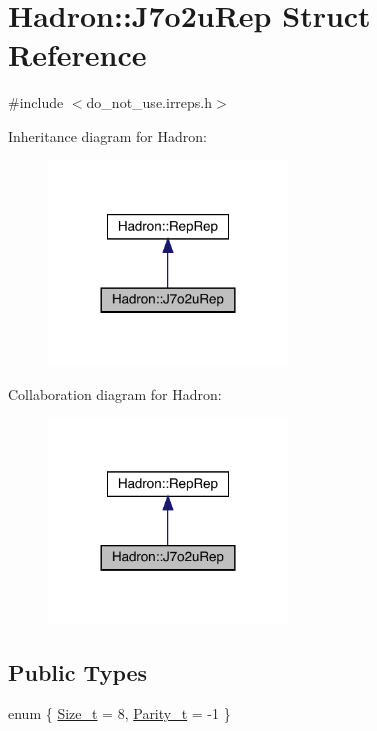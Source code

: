 \hypertarget{structHadron_1_1J7o2uRep}{}\section{Hadron\+:\+:J7o2u\+Rep Struct Reference}
\label{structHadron_1_1J7o2uRep}


{\ttfamily \#include $<$do\+\_\+not\+\_\+use.\+irreps.\+h$>$}



Inheritance diagram for Hadron\+:\nopagebreak
\begin{figure}[H]
\begin{center}
\leavevmode
\includegraphics[width=180pt]{dd/d5e/structHadron_1_1J7o2uRep__inherit__graph}
\end{center}
\end{figure}


Collaboration diagram for Hadron\+:\nopagebreak
\begin{figure}[H]
\begin{center}
\leavevmode
\includegraphics[width=180pt]{d0/db4/structHadron_1_1J7o2uRep__coll__graph}
\end{center}
\end{figure}
\subsection*{Public Types}
\begin{DoxyCompactItemize}
\item 
enum \{ \mbox{\hyperlink{structHadron_1_1J7o2uRep_ac6f35807d90800577dd4da8293ec3057a3f72aff9803a68d20ff4b1baab3df0d1}{Size\+\_\+t}} = 8, 
\mbox{\hyperlink{structHadron_1_1J7o2uRep_ac6f35807d90800577dd4da8293ec3057a0a248f5ccc72dd18fcab4bdc2180f93a}{Parity\+\_\+t}} = -\/1
 \}
\end{DoxyCompactItemize}
